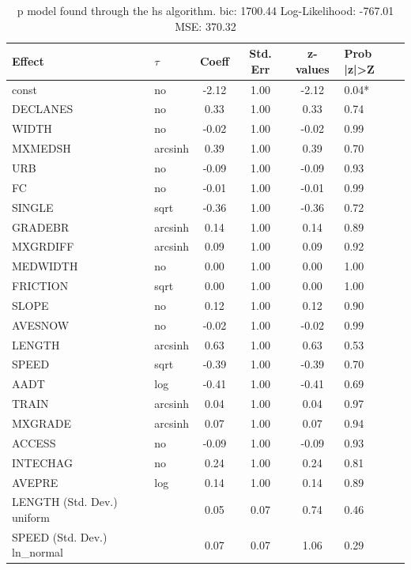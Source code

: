 \begin{table}
	\caption{p model found through the hs algorithm. bic: 1700.44 Log-Likelihood: -767.01 MSE: 370.32}
	\begin{center}
		\begin{tabular}{|l|l|c|c|c|l|}
			\hline
			Effect & $\tau$ & Coeff & Std. Err & z-values & Prob |z|>Z \\
			\hline
			const & no & -2.12 & 1.00 & -2.12 & 0.04* \\
			\hline
			DECLANES & no & 0.33 & 1.00 & 0.33 & 0.74 \\
			\hline
			WIDTH & no & -0.02 & 1.00 & -0.02 & 0.99 \\
			\hline
			MXMEDSH & arcsinh & 0.39 & 1.00 & 0.39 & 0.70 \\
			\hline
			URB & no & -0.09 & 1.00 & -0.09 & 0.93 \\
			\hline
			FC & no & -0.01 & 1.00 & -0.01 & 0.99 \\
			\hline
			SINGLE & sqrt & -0.36 & 1.00 & -0.36 & 0.72 \\
			\hline
			GRADEBR & arcsinh & 0.14 & 1.00 & 0.14 & 0.89 \\
			\hline
			MXGRDIFF & arcsinh & 0.09 & 1.00 & 0.09 & 0.92 \\
			\hline
			MEDWIDTH & no & 0.00 & 1.00 & 0.00 & 1.00 \\
			\hline
			FRICTION & sqrt & 0.00 & 1.00 & 0.00 & 1.00 \\
			\hline
			SLOPE & no & 0.12 & 1.00 & 0.12 & 0.90 \\
			\hline
			AVESNOW & no & -0.02 & 1.00 & -0.02 & 0.99 \\
			\hline
			LENGTH & arcsinh & 0.63 & 1.00 & 0.63 & 0.53 \\
			\hline
			SPEED & sqrt & -0.39 & 1.00 & -0.39 & 0.70 \\
			\hline
			AADT & log & -0.41 & 1.00 & -0.41 & 0.69 \\
			\hline
			TRAIN & arcsinh & 0.04 & 1.00 & 0.04 & 0.97 \\
			\hline
			MXGRADE & arcsinh & 0.07 & 1.00 & 0.07 & 0.94 \\
			\hline
			ACCESS & no & -0.09 & 1.00 & -0.09 & 0.93 \\
			\hline
			INTECHAG & no & 0.24 & 1.00 & 0.24 & 0.81 \\
			\hline
			AVEPRE & log & 0.14 & 1.00 & 0.14 & 0.89 \\
			\hline
			LENGTH (Std. Dev.) uniform &  & 0.05 & 0.07 & 0.74 & 0.46 \\
			\hline
			SPEED (Std. Dev.) ln_normal &  & 0.07 & 0.07 & 1.06 & 0.29 \\

\end{tabular}
\end{center}
\end{table}
